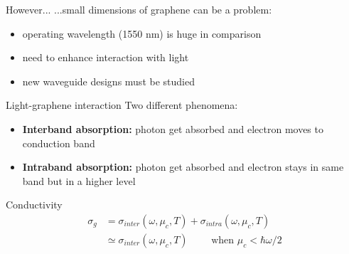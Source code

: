 \documentclass[handout,xcolor={usenames,dvipsnames},11pt]{beamer}
\begin{document}
\begin{frame}{However...}
    ...small dimensions of graphene can be a problem:\pause
    \begin{itemize}
        \item operating wavelength (1550 nm) is huge in comparison\pause
        \item need to enhance interaction with light\pause
        \item new waveguide designs must be studied
    \end{itemize}
    \begin{figure}
        \centering
        \caption{\cite{Xu2004,Sun2007}}
    \end{figure}
\end{frame}

\begin{frame}{Light-graphene interaction}
    Two different phenomena:\pause
    \begin{itemize}
        \item \textbf{Interband absorption:} photon get absorbed and electron moves to conduction band\pause
        \item \textbf{Intraband absorption:} photon get absorbed and electron stays in same band but in a higher level\pause
    \end{itemize} 

    \begin{alertblock}{Conductivity}
        \vspace{-8pt}
        \begin{align*}
            \sigma_g &= \sigma_{inter}(\omega,\mu_c, T) + \sigma_{intra}(\omega,\mu_c, T) \\
                     &\simeq \sigma_{inter}(\omega,\mu_c, T)  
            \qquad\text{ when } \mu_c < \hbar\omega/2
        \end{align*}
    \end{alertblock} 
\end{frame}
\end{document}
